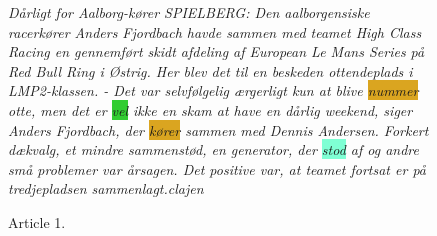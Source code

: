 \begin{figure}
	\begin{tcolorbox}
		\emph{
			Dårligt  for Aalborg-kører SPIELBERG: Den aalborgensiske racerkører Anders Fjordbach havde sammen med teamet High Class Racing en gennemført skidt  afdeling af European Le Mans Series på Red Bull Ring i Østrig. Her blev det til en beskeden ottendeplads i LMP2-klassen. - Det var \colorbox{Peach}{selvfølgelig} ærgerligt kun at blive \colorbox{Goldenrod}{nummer} otte, men det er \colorbox{LimeGreen}{vel} ikke en skam at have en dårlig weekend, siger Anders Fjordbach, der \colorbox{Goldenrod}{kører} sammen med Dennis Andersen.  Forkert dækvalg, et \colorbox{Peach}{mindre} sammenstød, en generator, der \colorbox{Aquamarine}{stod} af og andre små problemer var årsagen. Det  positive var, at teamet \colorbox{Peach}{fortsat} er på tredjepladsen sammenlagt.clajen
		}
	\end{tcolorbox}
	\caption{Article 1.}
	\label{art:1}
\end{figure}

